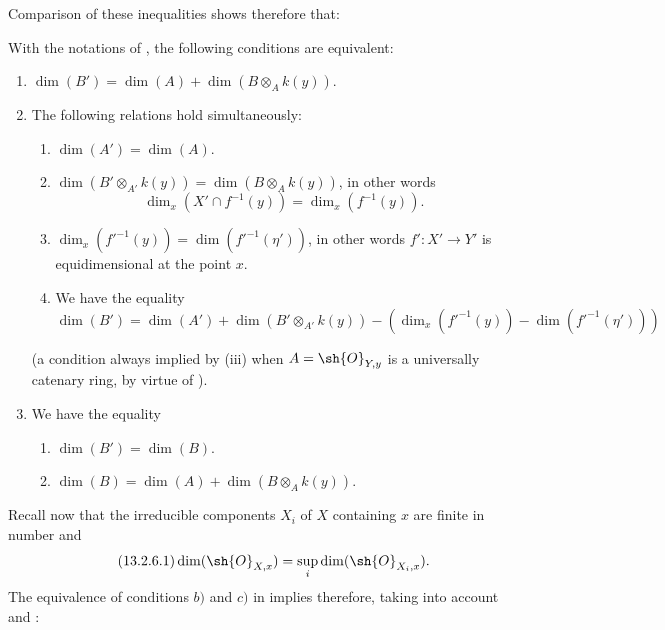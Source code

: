 
Comparison of these inequalities shows therefore that:

\begin{lemma}[13.2.5]
\label{IV.13.2.5}
With the notations of , the following conditions are equivalent:
\begin{enumerate}[label=\emph{\alph*)}]
  \item $\dim(B')=\dim(A)+\dim(B\otimes_A k(y))$.
  \item The following relations hold simultaneously:
  \begin{enumerate}[label=(\roman*)]
    \item $\dim(A')=\dim(A)$.
    \item $\dim(B'\otimes_{A'}k(y))=\dim(B\otimes_A k(y))$, in other words
    \[
      \dim_x(X'\cap f^{-1}(y))=\dim_x(f^{-1}(y)).
    \]
    \item $\dim_x(f'^{-1}(y))=\dim(f'^{-1}(\eta'))$, in other words $f':X'\to Y'$ is equidimensional  at the point $x$.
    \item We have the equality
    \[
      \dim(B')=\dim(A')+\dim(B'\otimes_{A'}k(y))-(\dim_x(f'^{-1}(y))-\dim(f'^{-1}(\eta')))
    \]
  \end{enumerate}
  (a condition always implied by (iii) when $A=\sh{O}_{Y,y}$ is a universally catenary ring, by virtue of ).
  \item We have the equality
  \begin{enumerate}[label=(\roman*)]
    \item $\dim(B')=\dim(B)$.
    \item $\dim(B)=\dim(A)+\dim(B\otimes_A k(y))$.
  \end{enumerate}
\end{enumerate}
\end{lemma}

\begin{env}[13.2.6]
\label{IV.13.2.6}
Recall now that the irreducible components $X_i$ of $X$ containing $x$ are finite in number  and 
\[
\tag{13.2.6.1}
  \dim(\sh{O}_{X,x})=\sup_i\dim(\sh{O}_{X_i,x}).
\]
The equivalence of conditions $b)$ and $c)$ in  implies therefore, taking into account  and :
\end{env}

